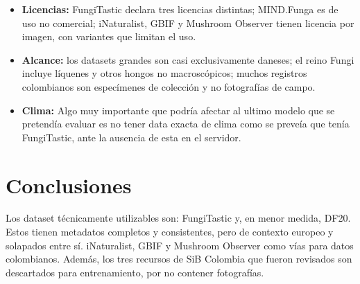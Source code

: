 \documentclass[11pt,a4paper]{article}
\begin{document}
\begin{itemize}
    \item \textbf{Licencias:} FungiTastic declara tres licencias distintas;
    MIND.Funga es de uso no comercial; iNaturalist, GBIF y Mushroom Observer
    tienen licencia por imagen, con variantes que limitan el uso.
    \item \textbf{Alcance:} los datasets grandes son casi exclusivamente daneses;
    el reino Fungi incluye líquenes y otros hongos no macroscópicos; muchos
    registros colombianos son especímenes de colección y no fotografías de campo.
    \item \textbf{Clima:} Algo muy importante que podría afectar al ultimo modelo que se pretendía evaluar es no tener data exacta de clima como se preveía que tenía FungiTastic, ante la ausencia de esta en el servidor.
\end{itemize}


\section{Conclusiones}



    Los dataset técnicamente utilizables son: FungiTastic y, en menor medida, DF20. Estos tienen 
    metadatos completos y consistentes, pero de contexto europeo y solapados
    entre sí. iNaturalist, GBIF y Mushroom Observer como vías para datos
    colombianos. Además, los tres recursos de SiB
    Colombia que fueron revisados son descartados para entrenamiento, por no contener fotografías.
\end{document}
